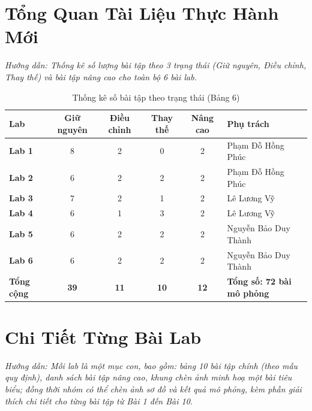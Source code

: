 \documentclass[12pt,a4paper]{report}
\begin{document}
\chapter{Tổng Quan Tài Liệu Thực Hành Mới}

\textit{\color{guidegray}
Hướng dẫn: Thống kê số lượng bài tập theo 3 trạng thái (Giữ nguyên, Điều chỉnh, Thay thế) và bài tập nâng cao cho toàn bộ 6 bài lab.
}

\begin{table}[H]
\centering
\caption{Thống kê số bài tập theo trạng thái (Bảng 6)}
\label{tab:bang6_thongke}
\renewcommand{\arraystretch}{1.3}
\begin{tabularx}{\textwidth}{|l|c|c|c|c|X|}
\hline
\rowcolor{codebg}
\textbf{Lab} & \textbf{Giữ nguyên} & \textbf{Điều chỉnh} & \textbf{Thay thế} & \textbf{Nâng cao} & \textbf{Phụ trách} \\ \hline
\textbf{Lab 1} & 8 & 2 & 0 & 2 & Phạm Đỗ Hồng Phúc \\ \hline
\textbf{Lab 2} & 6 & 2 & 2 & 2 & Phạm Đỗ Hồng Phúc \\ \hline
\textbf{Lab 3} & 7 & 2 & 1 & 2 & Lê Lương Vỹ \\ \hline
\textbf{Lab 4} & 6 & 1 & 3 & 2 & Lê Lương Vỹ \\ \hline
\textbf{Lab 5} & 6 & 2 & 2 & 2 & Nguyễn Bảo Duy Thành \\ \hline
\textbf{Lab 6} & 6 & 2 & 2 & 2 & Nguyễn Bảo Duy Thành \\ \hline
\hline
\rowcolor{codebg}
\textbf{Tổng cộng} & \textbf{39} & \textbf{11} & \textbf{10} & \textbf{12} & \textbf{Tổng số: 72 bài mô phỏng} \\ \hline
\end{tabularx}
\end{table}

\chapter{Chi Tiết Từng Bài Lab}

\textit{\color{guidegray}
Hướng dẫn: Mỗi lab là một mục con, bao gồm: bảng 10 bài tập chính (theo mẫu quy định), danh sách bài tập nâng cao, khung chèn ảnh minh hoạ một bài tiêu biểu; đồng thời nhóm có thể chèn ảnh sơ đồ và kết quả mô phỏng, kèm phần giải thích chi tiết cho từng bài tập từ Bài 1 đến Bài 10.
}
\end{document}
